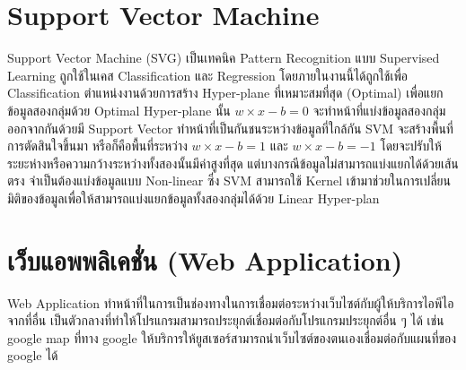 \section{Support Vector Machine}
Support Vector Machine (SVG) \cite{cory2} เป็นเทคนิค Pattern Recognition แบบ Supervised Learning ถูกใช้ในเคส Classification และ Regression 
โดยภายในงานนี้ได้ถูกใช้เพื่อ Classification ตำแหน่งงานด้วยการสร้าง Hyper-plane ที่เหมาะสมที่สุด (Optimal)
เพื่อแยกข้อมูลสองกลุ่มด้วย Optimal Hyper-plane นั้น $w \times x - b = 0$ จะทำหน้าที่แบ่งข้อมูลสองกลุ่มออกจากกันด้วยมี Support Vector ทำหน้าที่เป็นกันชนระหว่างข้อมูลที่ใกล้กัน SVM จะสร้างพื้นที่การตัดสินใจขึ้นมา
หรือก็คือพื้นที่ระหว่าง $w \times x - b = 1$ และ $w \times x - b = -1$ โดยจะปรับให้ระยะห่างหรือความกว้างระหว่างทั้งสองนั้นมีค่าสูงที่สุด แต่บางกรณีข้อมูลไม่สามารถแบ่งแยกได้ด้วยเส้นตรง จำเป็นต้องแบ่งข้อมูลแบบ Non-linear ซึ่ง
SVM สามารถใช้ Kernel เข้ามาช่วยในการเปลี่ยนมิติของข้อมูลเพื่อให้สามารถแบ่งแยกข้อมูลทั้งสองกลุ่มได้ด้วย Linear Hyper-plan

\section{เว็บแอพพลิเคชั่น (Web Application)} 
Web Application \cite{margaret} ทำหน้าที่ในการเป็นช่องทางในการเชื่อมต่อระหว่างเว็บไซต์กับผู้ให้บริการไอพีไอจากที่อื่น เป็นตัวกลางที่ทำให้โปรแกรมสามารถประยุกต์เชื่อมต่อกับโปรแกรมประยุกต์อื่น ๆ ได้ เช่น google map ที่ทาง google ให้บริการให้ยูสเซอร์สามารถนำเว็บไซต์ของตนเองเชื่อมต่อกับแผนที่ของ google ได้




